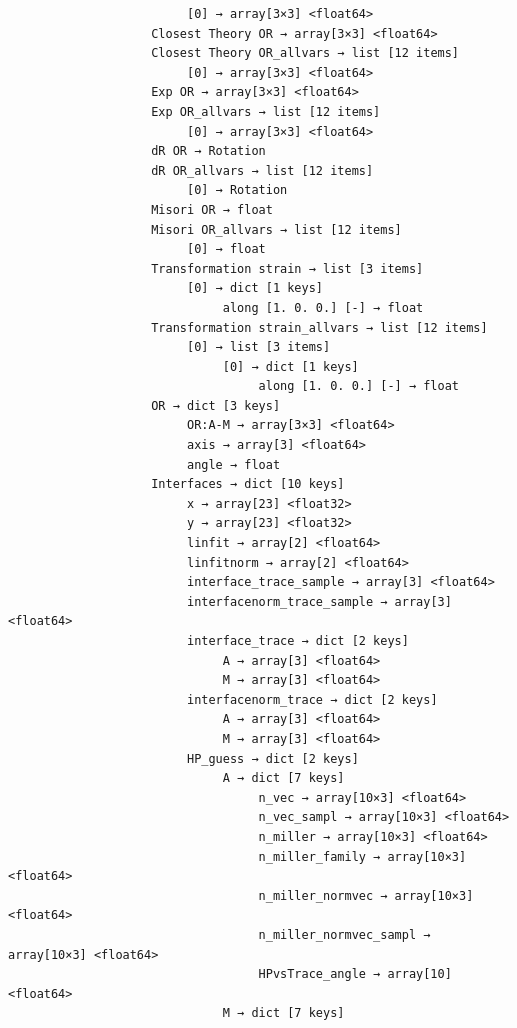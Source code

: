 \documentclass[a4paper,10pt]{article}
\begin{document}
\begin{verbatim}
                         [0] → array[3×3] <float64>
                    Closest Theory OR → array[3×3] <float64>
                    Closest Theory OR_allvars → list [12 items]
                         [0] → array[3×3] <float64>
                    Exp OR → array[3×3] <float64>
                    Exp OR_allvars → list [12 items]
                         [0] → array[3×3] <float64>
                    dR OR → Rotation
                    dR OR_allvars → list [12 items]
                         [0] → Rotation
                    Misori OR → float
                    Misori OR_allvars → list [12 items]
                         [0] → float
                    Transformation strain → list [3 items]
                         [0] → dict [1 keys]
                              along [1. 0. 0.] [-] → float
                    Transformation strain_allvars → list [12 items]
                         [0] → list [3 items]
                              [0] → dict [1 keys]
                                   along [1. 0. 0.] [-] → float
                    OR → dict [3 keys]
                         OR:A-M → array[3×3] <float64>
                         axis → array[3] <float64>
                         angle → float
                    Interfaces → dict [10 keys]
                         x → array[23] <float32>
                         y → array[23] <float32>
                         linfit → array[2] <float64>
                         linfitnorm → array[2] <float64>
                         interface_trace_sample → array[3] <float64>
                         interfacenorm_trace_sample → array[3] <float64>
                         interface_trace → dict [2 keys]
                              A → array[3] <float64>
                              M → array[3] <float64>
                         interfacenorm_trace → dict [2 keys]
                              A → array[3] <float64>
                              M → array[3] <float64>
                         HP_guess → dict [2 keys]
                              A → dict [7 keys]
                                   n_vec → array[10×3] <float64>
                                   n_vec_sampl → array[10×3] <float64>
                                   n_miller → array[10×3] <float64>
                                   n_miller_family → array[10×3] <float64>
                                   n_miller_normvec → array[10×3] <float64>
                                   n_miller_normvec_sampl → array[10×3] <float64>
                                   HPvsTrace_angle → array[10] <float64>
                              M → dict [7 keys]

\end{verbatim}
\end{document}
